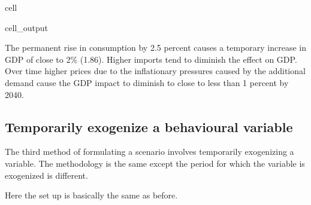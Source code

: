 \documentclass[letterpaper,10pt,english]{jupyterBook}
\begin{document}
\begin{sphinxuseclass}{cell}
\begin{sphinxVerbatimOutput}
\begin{sphinxuseclass}{cell_output}
\end{sphinxuseclass}\end{sphinxVerbatimOutput}

\end{sphinxuseclass}
\sphinxAtStartPar
The permanent rise in consumption by 2.5 percent causes a temporary increase in GDP of close to 2\% (1.86). Higher imports tend to diminish the effect on GDP. Over time higher prices due to the inflationary pressures caused by the additional demand cause the GDP impact to diminish to close to less than 1 percent by 2040.


\subsection{Temporarily exogenize a behavioural variable}
\label{\detokenize{content/05_WBModels/ScenarioAnalysis:temporarily-exogenize-a-behavioural-variable}}
\sphinxAtStartPar
The third method of formulating a scenario involves temporarily exogenizing a variable. The methodology is the same except the period for which the variable is exogenized is different.

\sphinxAtStartPar
Here the set up is basically the same as before.
\end{document}
